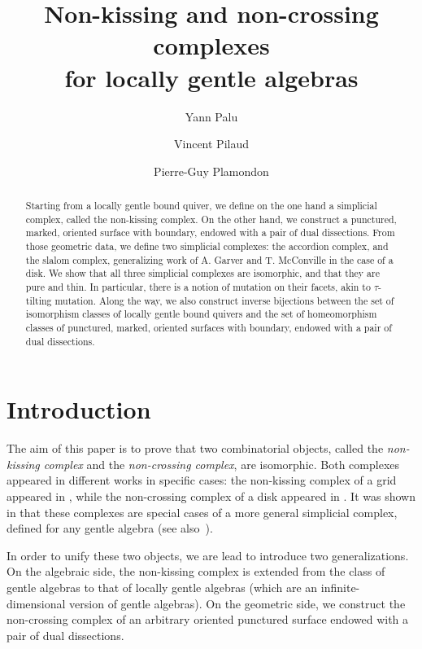 \documentclass{amsart}
\title[Non-kissing and non-crossing complexes for locally gentle algebras]{Non-kissing and non-crossing complexes \\ for locally gentle algebras}
\author{Yann Palu}
\author{Vincent Pilaud}
\author{Pierre-Guy Plamondon}
\theoremstyle{definition}
\begin{document}
\begin{abstract}
Starting from a locally gentle bound quiver, we define on the one hand a simplicial complex, called the non-kissing complex.
On the other hand, we construct a punctured, marked, oriented surface with boundary, endowed with a pair of dual dissections.
From those geometric data, we define two simplicial complexes: the accordion complex, and the slalom complex, generalizing work of A. Garver and T. McConville in the case of a disk.
We show that all three simplicial complexes are isomorphic, and that they are pure and thin.
In particular, there is a notion of mutation on their facets, akin to $\tau$-tilting mutation.
Along the way, we also construct inverse bijections between the set of isomorphism classes of locally gentle bound quivers and the set of homeomorphism classes of punctured, marked, oriented surfaces with boundary, endowed with a pair of dual dissections.
\end{abstract}

\vspace*{-1.3cm}
\maketitle
\vspace{-.7cm}

\section{Introduction}

\enlargethispage{.1cm}
The aim of this paper is to prove that two combinatorial objects, called the \emph{non-kissing complex} and the \emph{non-crossing complex}, are isomorphic.
Both complexes appeared in different works in specific cases: the non-kissing complex of a grid appeared in \cite{McConville}, while the non-crossing complex of a disk appeared in \cite{GarverMcConville, MannevillePilaud-accordion}.
It was shown in \cite{PaluPilaudPlamondon} that these complexes are special cases of a more general simplicial complex, defined for any gentle algebra (see also~\cite{BrustleDouvilleMousavandThomasYildirim}).

In order to unify these two objects, we are lead to introduce two generalizations.
On the algebraic side, the non-kissing complex is extended from the class of gentle algebras to that of locally gentle algebras (which are an infinite-dimensional version of gentle algebras).
On the geometric side, we construct the non-crossing complex of an arbitrary oriented punctured surface endowed with a pair of dual dissections.
\end{document}
